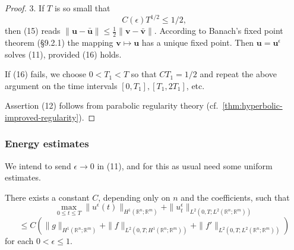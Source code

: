 \begin{proof}
3. If $T$ is so small that
\[
C(\epsilon) T^{1/2} \le 1/2,
\tag{16}
\]
then (15) reads $\|\mathbf{u} - \bar{\mathbf{u}}\| \le \frac{1}{2}\|\mathbf{v} - \bar{\mathbf{v}}\|$. According to Banach's fixed point theorem (\S9.2.1) the mapping $\mathbf{v} \mapsto \mathbf{u}$ has a unique fixed point. Then $\mathbf{u} = \mathbf{u}^\epsilon$ solves (11), provided (16) holds.

If (16) fails, we choose $0 < T_1 < T$ so that $CT_1 = 1/2$ and repeat the above argument on the time intervals $[0,T_1], [T_1, 2T_1]$, etc.

Assertion (12) follows from parabolic regularity theory (cf.\ \cref{thm:hyperbolic-improved-regularity}).
\end{proof}

\subsubsection{Energy estimates}

We intend to send $\epsilon \to 0$ in (11), and for this as usual need some uniform estimates.

\begin{theorem}
\label{thm:symmetric-hyperbolic-energy-estimates}
There exists a constant $C$, depending only on $n$ and the coefficients, such that
\[
\max_{0 \leq t \leq T} \|u^\epsilon(t)\|_{H^1(\mathbb{R}^n;\mathbb{R}^m)} + \|u_t^\epsilon\|_{L^2(0,T;L^2(\mathbb{R}^n;\mathbb{R}^m))}
\]
\[
\leq C(\|g\|_{H^1(\mathbb{R}^n;\mathbb{R}^m)} + \|f\|_{L^2(0,T;H^1(\mathbb{R}^n;\mathbb{R}^m))} + \|f'\|_{L^2(0,T;L^2(\mathbb{R}^n;\mathbb{R}^m))})
\tag{17}
\]
for each $0 < \epsilon \leq 1$.
\end{theorem}

